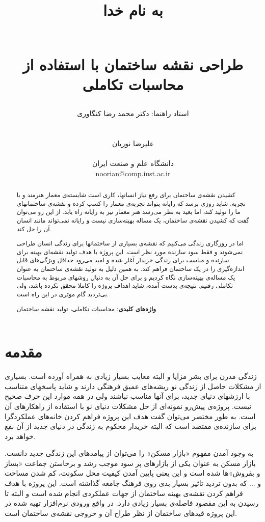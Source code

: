\documentclass{report}
\title{ 
\begin{normalsize} به نام خدا \end{normalsize}
\\[6cm]
طراحی نقشه ساختمان با استفاده از محاسبات تکاملی
\\[2cm]
}
\author{
استاد راهنما: دکتر محمد رضا کنگاوری
\\
\\
\\
علیرضا نوریان
\\
\\ \small دانشگاه علم و صنعت ایران
\\ \small noorian@comp.iust.ac.ir
}
\begin{document}
\maketitle

\begin{abstract}
کشیدن نقشه‌ی ساختمان برای رفع نیاز انسانها، کاری است شایسته‌ی معمار هنرمند و با تجربه. شاید روزی برسد که رایانه بتواند تجربه‌ی معمار را کسب کرده و نقشه‌ی ساختمانهای ما را تولید کند، اما بعید به نظر می‌رسد هنر معمار نیز به رایانه راه یابد. از این رو می‌توان گفت که کشیدن نقشه‌ی ساختمان، یک مساله بهینه‌سازی نیست و رایانه نمی‌تواند مانند انسان آن را حل کند.

اما در روزگاری زندگی می‌کنیم که نقشه‌ی بسیاری از ساختمانها برای زندگی انسان طراحی نمی‌شوند و فقط سود سازنده مورد نظر است. این پروژه با هدف تولید نقشه‌ای بهینه برای سازنده و مناسب برای زندگی خریدار آغاز شده و امید می‌رود حداقل ویژگی‌های قابل اندازه‌گیری را در یک ساختمان فراهم کند. به همین دلیل به تولید نقشه‌ی ساختمان به عنوان یک مساله‌ی بهینه‌سازی نگاه کردیم و برای حل آن به دنبال روشهای مربوط به محاسبات تکاملی رفتیم. نتیجه‌ی بدست آمده، شاید اهداف پروژه را کاملا محقق نکرده باشد، ولی بی‌تردید گام موثری در این راه است. 

\textbf{واژه‌های کلیدی}: محاسبات تکاملی، تولید نقشه ساختمان
\end{abstract}

\tableofcontents

\section{مقدمه}
زندگی مدرن برای بشر مزایا و البته معایب بسیار زیادی به همراه آورده است. بسیاری از مشکلات حاصل از زندگی نو ریشه‌های عمیق فرهنگی دارند و شاید پاسخهای متناسب با ارزشهای دنیای جدید، برای آنها مناسب نباشند ولی در همه موارد این حرف صحیح نیست. پروژه‌ی پیش‌رو نمونه‌ای از حل مشکلات دنیای نو با استفاده از راهکارهای آن است. به طور مختصر می‌توان گفت هدف این پروژه فراهم کردن خانه‌های عملکردگرا برای سازنده‌ی مقتصد است که البته خریدار محکوم به زندگی در دنیای جدید از آن نفع خواهد برد.

به وجود آمدن مفهوم «بازار مسکن» را می‌توان از پیامدهای این زندگی جدید دانست. بازار مسکن به عنوان یکی از بازارهای پر سود موجب رشد و برخاستن جماعت «بساز و بفروش»ها شده است و این یعنی پایین آمدن کیفیت محل سکونت، کم شدن مساحت و ... که بدون تردید تاثیر بسیار بدی روی فرهنگ جامعه گذاشته است. این پروژه با هدف فراهم کردن نقشه‌ی بهینه ساختمان از جهات عملکردی انجام شده است و البته تا رسیدن به این مقصود فاصله‌ی بسیار زیادی دارد. در واقع ورودی نرم‌افزار تهیه شده در این پروژه قیدهای ساختمان از نظر طراح آن و خروجی نقشه‌ی ساختمان است.
\end{document}
